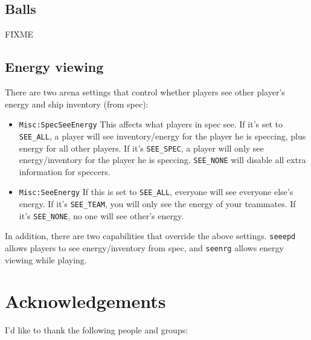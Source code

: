 \documentclass{article}
\begin{document}
\subsection{Balls}

FIXME

\subsection{Energy viewing}

There are two arena settings that control whether players see other
player's energy and ship inventory (from spec):

\begin{itemize}

\item{\texttt{Misc:SpecSeeEnergy}} This affects what players in spec
see. If it's set to \verb/SEE_ALL/, a player will see inventory/energy
for the player he is speccing, plus energy for all other players. If
it's \verb/SEE_SPEC/, a player will only see energy/inventory for the
player he is speccing.  \verb/SEE_NONE/ will disable all extra
information for speccers.

\item{\texttt{Misc:SeeEnergy}} If this is set to \verb/SEE_ALL/,
everyone will see everyone else's energy.  If it's \verb/SEE_TEAM/, you
will only see the energy of your teammates. If it's \verb/SEE_NONE/, no
one will see other's energy.

\end{itemize}

In addition, there are two capabilities that override the above
settings. \verb/seeepd/ allows players to see energy/inventory from
spec, and \verb/seenrg/ allows energy viewing while playing.


\section{Acknowledgements}

I'd like to thank the following people and groups:
\end{document}

